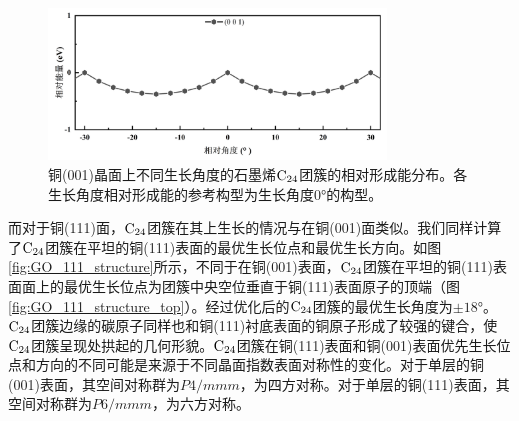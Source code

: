         \begin{figure}[htb]
            \includegraphics[width=0.8\textwidth]{pic/GO_C24_flat_001_energy.png}
            
            \caption{铜(001)晶面上不同生长角度的石墨烯$\rm{C_{24}}$团簇的相对形成能分布。各生长角度相对形成能的参考构型为生长角度0\si{\degree}的构型。
            }
            
            \label{fig:GO_001_energy}
        \end{figure}

        而对于铜(111)面，$\rm{C_{24}}$团簇在其上生长的情况与在铜(001)面类似。我们同样计算了$\rm{C_{24}}$团簇在平坦的铜(111)表面的最优生长位点和最优生长方向。如图\ref{fig:GO_111_structure}所示，不同于在铜(001)表面，$\rm{C_{24}}$团簇在平坦的铜(111)表面面上的最优生长位点为团簇中央空位垂直于铜(111)表面原子的顶端（图\ref{fig:GO_111_structure_top}）。经过优化后的$\rm{C_{24}}$团簇的最优生长角度为$\pm 18\si{\degree}$。$\rm{C_{24}}$团簇边缘的碳原子同样也和铜(111)衬底表面的铜原子形成了较强的键合，使$\rm{C_{24}}$团簇呈现处拱起的几何形貌。$\rm{C_{24}}$团簇在铜(111)表面和铜(001)表面优先生长位点和方向的不同可能是来源于不同晶面指数表面对称性的变化。对于单层的铜(001)表面，其空间对称群为$P4/mmm$，为四方对称。对于单层的铜(111)表面，其空间对称群为$P6/mmm$，为六方对称。


